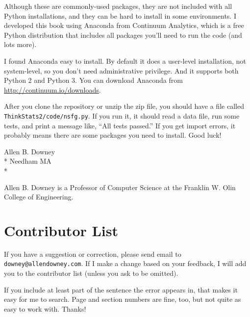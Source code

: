 \documentclass[12pt]{book}
\begin{document}
Although these are commonly-used packages, they are not included with
all Python installations, and they can be hard to install in some
environments.  I developed this book using Anaconda from Continuum
Analytics, which is a free Python distribution that includes all
packages you'll need to run the code (and lots more).

I found Anaconda easy to install.  By default it does a user-level
installation, not system-level, so you don't need administrative
privilege.  And it supports both Python 2 and Python 3.  You can
download Anaconda from \url{http://continuum.io/downloads}.

After you clone the repository or unzip the zip file, you should
have a file called {\tt ThinkStats2/code/nsfg.py}.  If you run it,
it should read a data file, run some tests, and print a message
like, ``All tests passed.''  If you get import errors, it probably
means there are some packages you need to install.  Good luck!


Allen B. Downey \\*
Needham MA \\*

Allen B. Downey is a Professor of Computer Science at 
the Franklin W. Olin College of Engineering.







\section*{Contributor List}

If you have a suggestion or correction, please send email to 
{\tt downey@allendowney.com}.  If I make a change based on your
feedback, I will add you to the contributor list
(unless you ask to be omitted).

If you include at least part of the sentence the
error appears in, that makes it easy for me to search.  Page and
section numbers are fine, too, but not quite as easy to work with.
Thanks!

\small
\end{document}
